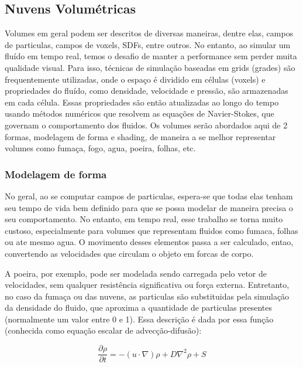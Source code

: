 \subsection{Nuvens Volumétricas}
\label{sec:volumes}

Volumes em geral podem ser descritos de diversas maneiras, dentre elas, campos de particulas, campos de voxels, SDFs, entre outros. No entanto, ao simular um fluído em tempo real, temos o desafio de manter a performance sem perder muita qualidade visual. Para isso, técnicas de simulação baseadas em grids (grades) são frequentemente utilizadas, onde o espaço é dividido em células (voxels) e propriedades do fluído, como densidade, velocidade e pressão, são armazenadas em cada célula. Essas propriedades são então atualizadas ao longo do tempo usando métodos numéricos que resolvem as equações de Navier-Stokes, que governam o comportamento dos fluidos. Os volumes serão abordados aqui de 2 formas, modelagem de forma e shading, de maneira a se melhor representar volumes como fumaça, fogo, agua, poeira, folhas, etc.

\subsubsection{Modelagem de forma}
No geral, ao se computar campos de particulas, espera-se que todas elas tenham seu tempo de vida bem definido para que se possa modelar de maneira precisa o seu comportamento. No entanto, em tempo real, esse trabalho se torna muito custoso, especialmente para volumes que representam fluidos como fumaca, folhas ou ate mesmo agua. O movimento desses elementos passa a ser calculado, entao, convertendo as velocidades que circulam o objeto em forcas de corpo. 

A poeira, por exemplo, pode ser modelada sendo carregada pelo vetor de velocidades, sem qualquer resistência significativa ou força externa. Entretanto, no caso da fumaça ou das nuvens, as particulas são substituidas pela simulação da densidade do fluido, que aproxima a quantidade de particulas presentes (normalmente um valor entre 0 e 1). Essa descrição é dada por essa função (conhecida como equação escalar de advecção-difusão): 

$$
\frac{\partial \rho}{\partial t} = - (u \cdot \nabla) \rho + D \nabla^2 \rho + S
$$


